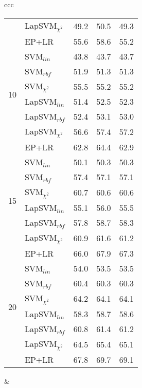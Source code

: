 \documentclass[journal,11pt]{IEEEtran}
\begin{document}
\begin{center}
{\begin{tabular}{ccc}
\begin{tabular}{|r|l|rrr|}
& LapSVM$_{\chi^2}$ & 49.2 & 50.5 & 49.3 \\
& EP+LR							& 55.6 & 58.6 & 55.2 \\
\hline
\multirow{6}{*}{10}
& SVM$_{lin}$ 	 		& 43.8 & 43.7 & 43.7 \\
& SVM$_{rbf}$ 	 		& 51.9 & 51.3 & 51.3 \\
& SVM$_{\chi^2}$ 		& 55.5 & 55.2 & 55.2 \\
& LapSVM$_{lin}$ 	 	& 51.4 & 52.5 & 52.3 \\
& LapSVM$_{rbf}$ 	 	& 52.4 & 53.1 & 53.0 \\
& LapSVM$_{\chi^2}$ & 56.6 & 57.4 & 57.2 \\
& EP+LR							& 62.8 & 64.4 & 62.9 \\
\hline
\multirow{6}{*}{15}
& SVM$_{lin}$ 	 		& 50.1 & 50.3 & 50.3 \\
& SVM$_{rbf}$ 	 		& 57.4 & 57.1 & 57.1 \\
& SVM$_{\chi^2}$ 		& 60.7 & 60.6 & 60.6 \\
& LapSVM$_{lin}$ 	 	& 55.1 & 56.0 & 55.5 \\
& LapSVM$_{rbf}$ 	 	& 57.8 & 58.7 & 58.3 \\
& LapSVM$_{\chi^2}$ & 60.9 & 61.6 & 61.2 \\
& EP+LR							& 66.0 & 67.9 & 67.3 \\
\hline
\multirow{6}{*}{20}
& SVM$_{lin}$ 	 		& 54.0 & 53.5 & 53.5 \\
& SVM$_{rbf}$ 	 		& 60.4 & 60.3 & 60.3 \\
& SVM$_{\chi^2}$ 		& 64.2 & 64.1 & 64.1 \\
& LapSVM$_{lin}$ 	 	& 58.3 & 58.7 & 58.6 \\
& LapSVM$_{rbf}$ 	 	& 60.8 & 61.4 & 61.2 \\
& LapSVM$_{\chi^2}$ & 64.5 & 65.4 & 65.1 \\
& EP+LR							& 67.8 & 69.7 & 69.1 \\
\hline
\end{tabular}

&


\end{tabular}}
\end{center}
\end{document}
